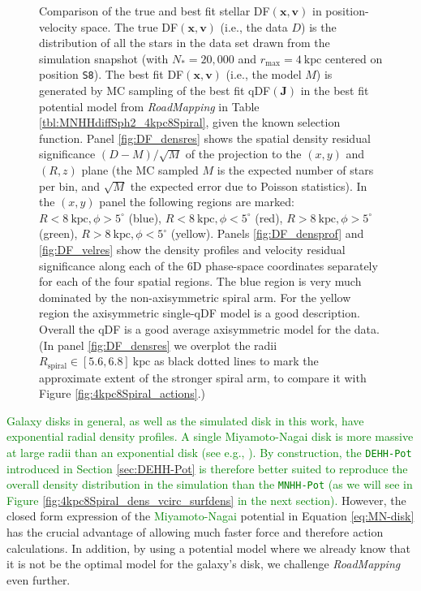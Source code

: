 \documentclass[iop,revtex4,numberedappendix,appendixfloats]{emulateapj}
\newcommand{\vect}[1]{\boldsymbol{#1}}
\newcommand{\RM}{{\sl RoadMapping}}
\newcommand{\NEW}[1]{\textcolor{Green}{#1}}
\newcommand{\OLD}[1]{}
\begin{document}
\begin{figure}[!htbp]
  \caption{Comparison of the true and best fit stellar DF$(\vect{x},\vect{v})$ in position-velocity space. The true DF$(\vect{x},\vect{v})$ (i.e., the data $D$) is the distribution of all the stars in the data set drawn from the simulation snapshot (with $N_*=20,000$ and $r_\text{max}=4~\text{kpc}$ centered on position \texttt{S8}). The best fit DF$(\vect{x},\vect{v})$ (i.e., the model $M$) is generated by MC sampling of the best fit qDF$(\vect{J})$ in the best fit potential model from \RM{} in Table \ref{tbl:MNHHdiffSph2_4kpc8Spiral}, given the known selection function. Panel \ref{fig:DF_densres} shows the spatial density residual significance $(D-M)/\sqrt{M}$ of the projection to the $(x,y)$ and $(R,z)$ plane (the MC sampled $M$ is the expected number of stars per bin, and $\sqrt{M}$ the expected error due to Poisson statistics). In the $(x,y)$ panel the following regions are marked: $R<8~\text{kpc},\phi>5^\circ$ (blue), $R<8~\text{kpc},\phi<5^\circ$ (red), $R>8~\text{kpc},\phi>5^\circ$ (green), $R>8~\text{kpc},\phi<5^\circ$ (yellow). Panels \ref{fig:DF_densprof} and \ref{fig:DF_velres} show the density profiles and velocity residual significance along each of the 6D phase-space coordinates separately for each of the four spatial regions. The blue region is very much dominated by the non-axisymmetric spiral arm. For the yellow region the axisymmetric single-qDF model is a good description. Overall the qDF is a good average axisymmetric model for the data. (In panel \ref{fig:DF_densres} we overplot the radii $R_\text{spiral} \in [5.6,6.8]~\text{kpc}$ as black dotted lines to mark the approximate extent of the stronger spiral arm, to compare it with Figure \ref{fig:4kpc8Spiral_actions}.)}
  \label{fig:4kpc8Spiral_DF_comparison}
\end{figure}

\NEW{Galaxy disks in general, as well as the simulated disk in this work, have exponential radial density profiles. A single Miyamoto-Nagai disk is more massive at large radii than an exponential disk (see e.g., \citealt{2015MNRAS.448.2934S}). By construction, the \texttt{DEHH-Pot} introduced in Section \ref{sec:DEHH-Pot} is therefore better suited to reproduce the overall density distribution in the simulation than the \texttt{MNHH-Pot} (as we will see in Figure \ref{fig:4kpc8Spiral_dens_vcirc_surfdens} in the next section). }\OLD{The \texttt{DEHH-Pot} introduced in Section \ref{sec:DEHH-Pot} is better than the Miyamoto-Nagai disk in reproducing the overall radial density slope, as we will see in Figures \ref{fig:4kpc8Spiral_density} and \ref{fig:4kpc8Spiral_vcirc_surfdens} in the next section.} However, the closed form expression of the \NEW{Miyamoto-Nagai} potential in Equation \eqref{eq:MN-disk} has the crucial advantage of allowing much faster force and therefore action calculations. In addition, by using a potential model where we already know that it is not be the optimal model for the galaxy's disk, we challenge \RM{} even further.
\end{document}
